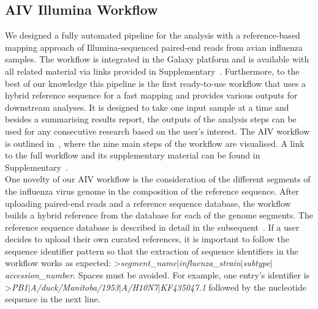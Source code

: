 \subsection{AIV Illumina Workflow}\label{sec:aiv-wf}
We designed a fully automated pipeline for the analysis with a reference-based mapping approach of Illumina-sequenced paired-end reads from avian influenza samples. The workflow is integrated in the Galaxy platform and is available with all related material via links provided in Supplementary~. Furthermore, to the best of our knowledge this pipeline is the first ready-to-use workflow that uses a hybrid reference sequence for a fast mapping and provides various outputs for downstream analyses. It is designed to take one input sample at a time and besides a summarising results report, the outputs of the analysis steps can be used for any consecutive research based on the user's interest. The \ac{AIV} workflow is outlined in~, where the nine main steps of the workflow are visualised. A link to the full workflow and its supplementary material can be found in Supplementary~. \\
One novelty of our \ac{AIV} workflow is the consideration of the different segments of the influenza virus genome in the composition of the reference sequence. After uploading paired-end reads and a reference sequence database, the workflow builds a hybrid reference from the database for each of the genome segments. The reference sequence database is described in detail in the subsequent~. If a user decides to upload their own curated references, it is important to follow the sequence identifier pattern so that the extraction of sequence identifiers in the workflow works as expected: >\textit{segment\_name$\mid$influenza\_strain$\mid$subtype$\mid$accession\_number}. Spaces must be avoided. For example, one entry's identifier is >\textit{PB1$\mid$A/duck/Manitoba/1953$\mid$A/H10N7$\mid$KF435047.1} followed by the nucleotide sequence in the next line. 

